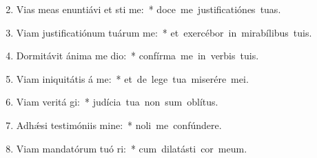 \begin{flushleft}
\begin{enumerate}[leftmargin=*]
\setcounter{enumi}{1}

\item Vias meas enuntiávi et sti me:~* \mbox{doce me justificatiónes tuas.}
\item Viam justificatiónum tuárum  me:~* \mbox{et exercébor in mirabílibus tuis.}
\item Dormitávit ánima me  dio:~* \mbox{confírma me in verbis tuis.}
\item Viam iniquitátis á  me:~* \mbox{et de lege tua miserére mei.}
\item Viam veritá gi:~* \mbox{judícia tua non sum oblítus.}
\item Adh\'{\ae}si testimóniis  mine:~* \mbox{noli me confúndere.}
\item Viam mandatórum tuó ri:~* \mbox{cum dilatásti cor meum.}



\end{enumerate}
\end{flushleft}

